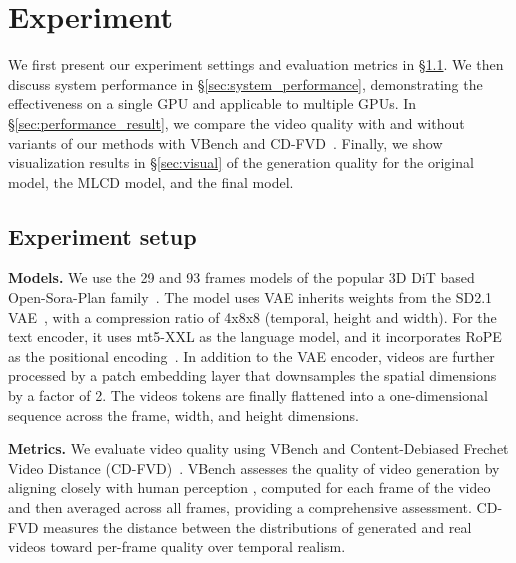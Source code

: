 \section{Experiment}
\label{sec:exp}
We first present our experiment settings and evaluation metrics in \S\ref{sec::setting}. We then discuss system performance in \S\ref{sec:system_performance}, demonstrating the effectiveness on a single GPU and applicable to multiple GPUs. %
In \S\ref{sec:performance_result}, we compare the video quality with and without variants of our methods with VBench and CD-FVD~\citep{huang2024vbench, cdfvd}. Finally, we show visualization results in \S\ref{sec:visual} of the generation quality for the original model, the MLCD model, and the final model.

\subsection{Experiment setup}
\label{sec::setting}

\textbf{Models.} We use the 29 and 93 frames models of the popular 3D DiT based Open-Sora-Plan family~\citep{pku_yuan_lab_and_tuzhan_ai_etc_2024_10948109}.  %
The model uses VAE inherits weights from the SD2.1 VAE~\citep{Rombach_2022_CVPR}, with a compression ratio of 4x8x8 (temporal, height and width). For the text encoder, it uses mt5-XXL as the language model, and it incorporates RoPE as the positional encoding~\citep{xue2020mt5, su2024roformer}. In addition to the VAE encoder, videos are further processed by a patch embedding layer that downsamples the spatial dimensions by a factor of 2. The videos tokens are finally flattened into a one-dimensional sequence across the frame, width, and height dimensions.

\textbf{Metrics.} We evaluate video quality using VBench and Content-Debiased Frechet Video Distance (CD-FVD)~\citep{huang2024vbench, cdfvd}. VBench assesses the quality of video generation by aligning closely with human perception %
, computed for each frame of the video and then averaged across all frames, providing a comprehensive assessment. CD-FVD measures the distance between the distributions of generated and real videos toward per-frame quality over temporal realism. %

